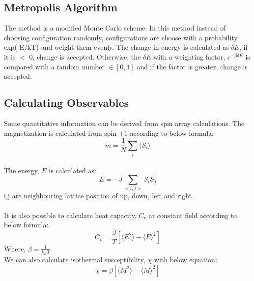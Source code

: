 \documentclass[]{article}
\begin{document}
\subsection{Metropolis Algorithm}
The method is a modified Monte Carlo scheme. In this method instead of choosing configuration randomly, configurations are choose with a probability exp(-E/kT) and weight them evenly.
The change in energy is calculated as $\delta E$, if it is $<$ 0, change is accepted. Otherwise, the $\delta E$ with a weighting factor, $e^{-\beta \delta E}$ is compared with a random number $\in [0,1] $ and if the factor is greater, change is accepted.
\\
\subsection{Calculating Observables}
Some quantitative information can be derived from spin array calculations. The magnetization is calculated from spin $\pm 1$ according to below formula:
\begin{equation} 
  m = \frac{1}{N}\sum_{i} \langle S_i \rangle
\end{equation}
\\
The energy, $E$ is calculated as:
\begin{equation} 
  E = - J \sum_{<i,j>} S_i S_j
\end{equation}
i,j are neighbouring lattice position of up, down, left and right.\\
\\
It is also possible to calculate heat capacity, $C_v$ at constant field according to below formula:
\begin{equation} 
  C_v = \frac{\beta}{T}[\langle E^2 \rangle - \langle E \rangle ^2]
\end{equation}
Where, $\beta = \frac{1}{k_B T}$ \\

We can also calculate isothermal susceptibility, $\chi$ with below equation:
\begin{equation} 
  \chi = \beta[\langle M^2 \rangle - \langle M \rangle ^2]
\end{equation}
\end{document}
